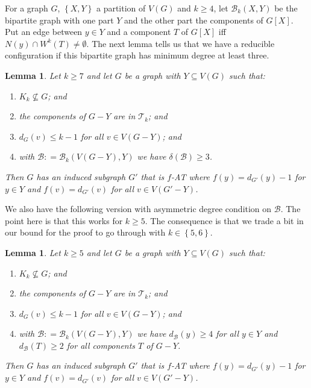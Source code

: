 \documentclass[10pt]{article}
\theoremstyle{plain}
\newtheorem{lem}[thm]{Lemma}
\theoremstyle{definition}
\theoremstyle{remark}
\newcommand{\fancy}[1]{\mathcal{#1}}
\newcommand{\T}{\fancy{T}}
\newcommand{\B}{\fancy{B}}
\newcommand{\set}[1]{\left\{ #1 \right\}}
\newcommand{\DefinedAs}{\mathrel{\mathop:}=}
\begin{document}
For a graph $G$, $\set{X, Y}$ a partition of $V(G)$ and $k \ge 4$, let $\B_k(X, Y)$ be the bipartite graph with one part $Y$ and the other part the components of $G[X]$.  Put an edge between $y \in Y$ and a component $T$ of $G[X]$ iff $N(y) \cap W^k(T) \ne \emptyset$.   The next lemma tells us that we have a reducible configuration if this bipartite graph has minimum degree at least three.  

\begin{lem}
	\label{MultipleHighConfigurationEuler} Let $k\ge7$ and let $G$ be a graph with
	$Y\subseteq V(G)$ such that: 
	\begin{enumerate}
		\item $K_{k}\not\subseteq G$; and 
		\item the components of $G-Y$ are in $\T_{k}$; and 
		\item $d_{G}(v)\leq k-1$ for all $v\in V(G-Y)$; and 
		\item with $\B\DefinedAs\B_{k}(V(G-Y),Y)$ we have $\delta(\B)\ge3$. 
	\end{enumerate}
	\noindent Then $G$ has an induced subgraph $G'$ that is $f$-AT where $f(y)=d_{G'}(y)-1$
	for $y\in Y$ and $f(v)=d_{G'}(v)$ for all $v\in V(G'-Y)$.\end{lem}

We also have the following version with asymmetric degree condition on $\B$.  
The point here is that this works for $k \ge 5$.  
The consequence is that we trade a bit in our bound for the proof to go through with $k \in \set{5,6}$.

\begin{lem}
	\label{MultipleHighConfigurationEulerLopsided} Let $k \ge 5$ and let $G$ be a graph with
	$Y\subseteq V(G)$ such that: 
	\begin{enumerate}
		\item $K_{k}\not\subseteq G$; and 
		\item the components of $G-Y$ are in $\T_{k}$; and 
		\item $d_{G}(v)\leq k-1$ for all $v\in V(G-Y)$; and 
		\item with $\B \DefinedAs \B_k(V(G-Y), Y)$ we have $d_{\B}(y) \ge 4$ for all $y \in Y$ and $d_{\B}(T) \ge 2$ for all components $T$ of $G-Y$.
	\end{enumerate}
	\noindent Then $G$ has an induced subgraph $G'$ that is $f$-AT where $f(y)=d_{G'}(y)-1$
	for $y\in Y$ and $f(v)=d_{G'}(v)$ for all $v\in V(G'-Y)$.
\end{lem}
\end{document}
